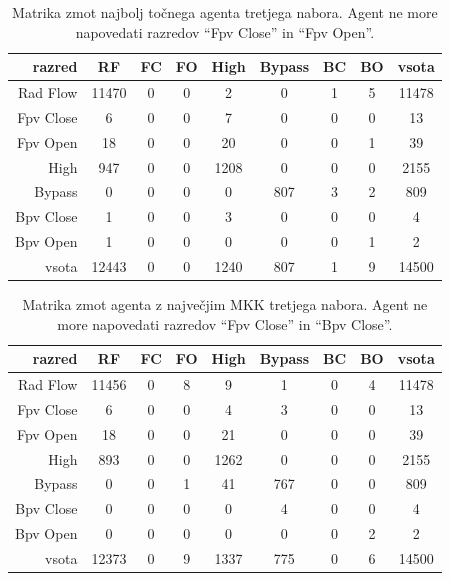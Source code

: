 \begin{table}[H]
    \centering
    \begin{tabular}{||rcccccccc||}
        \hline
        razred    & RF    & FC & FO & High & Bypass & BC & BO & vsota \\ \hline
        Rad Flow  & 11470 & 0  & 0  & 2    & 0      & 1  & 5  & 11478 \\ \hline
        Fpv Close & 6     & 0  & 0  & 7    & 0      & 0  & 0  & 13    \\ \hline
        Fpv Open  & 18    & 0  & 0  & 20   & 0      & 0  & 1  & 39    \\ \hline
        High      & 947   & 0  & 0  & 1208 & 0      & 0  & 0  & 2155  \\ \hline
        Bypass    & 0     & 0  & 0  & 0    & 807    & 3  & 2  & 809   \\ \hline
        Bpv Close & 1     & 0  & 0  & 3    & 0      & 0  & 0  & 4     \\ \hline
        Bpv Open  & 1     & 0  & 0  & 0    & 0      & 0  & 1  & 2     \\ \hline
        vsota     & 12443 & 0  & 0  & 1240 & 807    & 1  & 9  & 14500 \\ \hline
    \end{tabular}
    \caption{Matrika zmot najbolj točnega agenta tretjega nabora. Agent ne more napovedati razredov \enquote{Fpv Close} in \enquote{Fpv Open}.}
    \label{tab:statlog_acc_3}
\end{table}

\begin{table}[H]
    \centering
    \begin{tabular}{||rcccccccc||}
        \hline
        razred    & RF    & FC & FO & High & Bypass & BC & BO & vsota \\ \hline
        Rad Flow  & 11456 & 0  & 8  & 9    & 1      & 0  & 4  & 11478 \\ \hline
        Fpv Close & 6     & 0  & 0  & 4    & 3      & 0  & 0  & 13    \\ \hline
        Fpv Open  & 18    & 0  & 0  & 21   & 0      & 0  & 0  & 39    \\ \hline
        High      & 893   & 0  & 0  & 1262 & 0      & 0  & 0  & 2155  \\ \hline
        Bypass    & 0     & 0  & 1  & 41   & 767    & 0  & 0  & 809   \\ \hline
        Bpv Close & 0     & 0  & 0  & 0    & 4      & 0  & 0  & 4     \\ \hline
        Bpv Open  & 0     & 0  & 0  & 0    & 0      & 0  & 2  & 2     \\ \hline
        vsota     & 12373 & 0  & 9  & 1337 & 775    & 0  & 6  & 14500 \\ \hline
    \end{tabular}
    \caption{Matrika zmot agenta z največjim MKK tretjega nabora. Agent ne more napovedati razredov \enquote{Fpv Close} in \enquote{Bpv Close}.}
    \label{tab:statlog_mcc_3}
\end{table}

